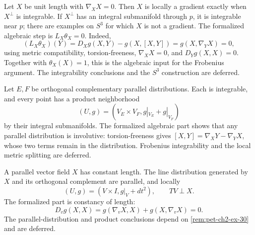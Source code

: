 \begin{remark}
  \label{rem:pet-ch2-ex-29}
  \leanok
  Let $X$ be unit length with $\nabla_XX=0$.
  Then $X$ is locally a gradient exactly when $X^\perp$ is integrable. If
  $X^\perp$ has an integral submanifold through $p$, it is integrable near
  $p$; there are examples on $S^3$ for which $X$ is not a gradient.
  \sketch
  The formalized algebraic step is
  $L_X\theta_X=0$. Indeed,
  \[
    (L_X\theta_X)(Y)
      =D_Xg(X,Y)-g(X,[X,Y])
      =g(X,\nabla_YX)=0,
  \]
  using metric compatibility, torsion-freeness, $\nabla_XX=0$, and
  $D_Yg(X,X)=0$. Together with $\theta_X(X)=1$, this is the algebraic input
  for the Frobenius argument. The integrability conclusions and the $S^3$
  construction are deferred.
\end{remark}

\begin{remark}
  \label{rem:pet-ch2-ex-30}
  \leanok
  Let $E,F$ be orthogonal complementary parallel
  distributions. Each is integrable, and every point has a product
  neighborhood
  \[
    (U,g)=(V_E\times V_F,g|_{V_E}+g|_{V_F})
  \]
  by their integral submanifolds.
  \sketch
  The formalized algebraic part shows that any parallel distribution is
  involutive: torsion-freeness gives
  $[X,Y]=\nabla_XY-\nabla_YX$, whose two terms remain in the distribution.
  Frobenius integrability and the local metric splitting are deferred.
\end{remark}

\begin{remark}
  \label{rem:pet-ch2-ex-31}
  \leanok
  A parallel vector field $X$ has constant
  length. The line distribution generated by $X$ and its orthogonal complement
  are parallel, and locally
  \[
    (U,g)=(V\times I,g|_V+dt^2),
    \qquad TV\perp X.
  \]
  \sketch
  The formalized part is constancy of length:
  \[
    D_vg(X,X)
      =g(\nabla_vX,X)+g(X,\nabla_vX)=0.
  \]
  The parallel-distribution and product conclusions depend on
  \cref{rem:pet-ch2-ex-30} and are deferred.
\end{remark}

